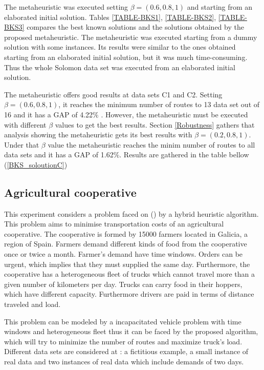 The metaheuristic was executed setting $\beta = (0.6, 0.8, 1)$ and starting from an elaborated initial solution. Tables \ref{TABLE-BKS1}, \ref{TABLE-BKS2}, \ref{TABLE-BKS3} compares the best known solutions and the solutions obtained by the proposed metaheuristic. The metaheuristic was executed starting from a dummy solution with some instances. Its results were similar to the ones obtained starting from an elaborated initial solution, but it was much time-consuming. Thus the whole Solomon data set was executed from an elaborated initial solution.

The metaheuristic offers good results at data sets C1 and C2. Setting $\beta = (0.6, 0.8, 1)$, it reaches the minimum number of routes to 13 data set out of 16 and it has a GAP of 4.22$\%$ . However, the metaheuristic must be executed with different $\beta$ values to get the best results. Section \ref{Robustness} gathers that analysis showing the metaheuristic gets its best results with $\beta = (0.2, 0.8, 1)$. Under that $\beta $ value the metaheuristic reaches the minim number of routes to all data sets and it has a GAP of 1.62$\%$. Results are gathered in the table bellow (\ref{BKS_soloutionC})

\clearpage






\subsection{Agricultural cooperative}\label{results-AIRA}

This experiment considers a problem faced on (\cite{Balbina}) by a hybrid heuristic algorithm. This problem aims to minimise transportation costs of an agricultural cooperative.
The cooperative is formed by 15000 farmers located in Galicia, a region of Spain. Farmers demand different kinds of food from the cooperative once or twice a month. Farmer's demand have time windows. Orders can be urgent, which implies that they must supplied the same day.
Furthermore, the cooperative has a heterogeneous fleet of trucks which cannot travel more than a given number of kilometers per day. Trucks can carry food in their hoppers, which have different capacity. Furthermore drivers are paid in terms of distance traveled and load. 

This problem can be modeled by a incapacitated vehicle problem with time windows and heterogeneous fleet thus it can be faced by the proposed algorithm, which will try to minimize the number of routes and maximize truck's load. Different data sets are considered at \cite{Balbina}: a fictitious example, a small instance of real data and two instances of real data which include demands of two days.

